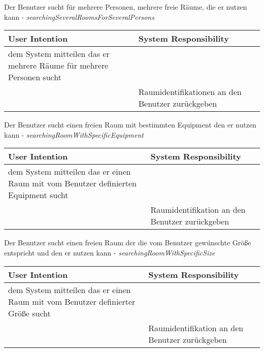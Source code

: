 \begin{table}[h]
	Der Benutzer sucht für mehrere Personen, mehrere freie Räume, die er nutzen kann - \textit{searchingSeveralRoomsForSeveralPersons}\\
	\begin{tabularx}{\textwidth}{|X|X|}
	\rowcolor{heading} \textbf{User Intention} & \textbf{System Responsibility}\\ \hline
	dem System mitteilen das er mehrere Räume für mehrere Personen sucht & \\
	 & Raumidentifikationen an den Benutzer zurückgeben \\ \hline
	\end{tabularx}
	
	Der Benutzer sucht einen freien Raum mit bestimmten Equipment den er nutzen kann - \textit{searchingRoomWithSpecificEquipment}\\
	\begin{tabularx}{\textwidth}{|X|X|}
	\rowcolor{heading} \textbf{User Intention} & \textbf{System Responsibility}\\ \hline
	dem System mitteilen das er einen Raum mit vom Benutzer definierten Equipment sucht & \\
	 & Raumidentifikation an den Benutzer zurückgeben \\ \hline
	\end{tabularx}
	
	Der Benutzer sucht einen freien Raum der die vom Benutzer gewünschte Größe entspricht und den er nutzen kann - \textit{searchingRoomWithSpecificSize}\\
	\begin{tabularx}{\textwidth}{|X|X|}
	\rowcolor{heading} \textbf{User Intention} & \textbf{System Responsibility}\\ \hline
	dem System mitteilen das er einen Raum mit vom Benutzer definierter Größe sucht & \\
	 & Raumidentifikation an den Benutzer zurückgeben \\ \hline
	\end{tabularx}
\end{table}
\clearpage
